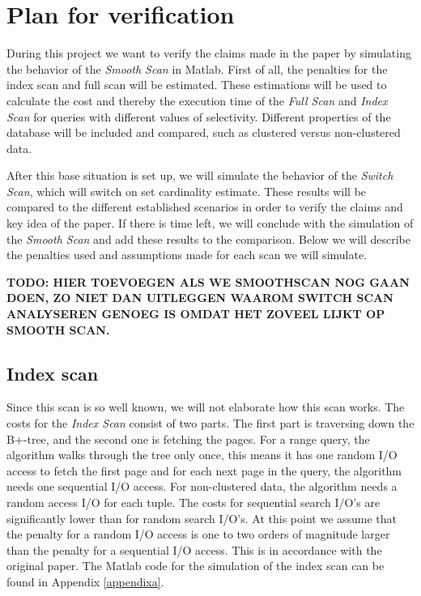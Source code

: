 \documentclass[a4paper,11pt,twoside]{article}
\begin{document}
\section{Plan for verification}
During this project we want to verify the claims made in the paper by simulating the behavior of the \emph{Smooth Scan} in Matlab. First of all, the penalties for the index scan and full scan will be estimated. These estimations will be used to calculate the cost and thereby the execution time of the \emph{Full Scan} and \emph{Index Scan} for queries with different values of selectivity. Different properties of the database will be included and compared, such as clustered versus non-clustered data. 

After this base situation is set up, we will simulate the behavior of the \emph{Switch Scan}, which will switch on set cardinality estimate. These results will be compared to the different established scenarios in order to verify the claims and key idea of the paper. If there is time left, we will conclude with the simulation of the \emph{Smooth Scan} and add these results to the comparison. Below we will describe the penalties used and assumptions made for each scan we will simulate.

\textbf{TODO: HIER TOEVOEGEN ALS WE SMOOTHSCAN NOG GAAN DOEN, ZO NIET DAN UITLEGGEN WAAROM SWITCH SCAN ANALYSEREN GENOEG IS OMDAT HET ZOVEEL LIJKT OP SMOOTH SCAN.}

\subsection{Index scan}
Since this scan is so well known, we will not elaborate how this scan works. The costs for the \textit{Index Scan} consist of two parts. The first part is traversing down the B+-tree, and the second one is fetching the pages. For a range query, the algorithm walks through the tree only once, this means it has one random I/O access to fetch the first page and for each next page in the query, the algorithm needs one sequential I/O access. For non-clustered data, the algorithm needs a random access I/O for each tuple. The costs for sequential search I/O's are significantly lower than for random search I/O's. At this point we assume that the penalty for a random I/O access is one to two orders of magnitude larger than the penalty for a sequential I/O access. This is in accordance with the original paper. The Matlab code for the simulation of the index scan can be found in Appendix \ref{appendixa}.
\end{document}
